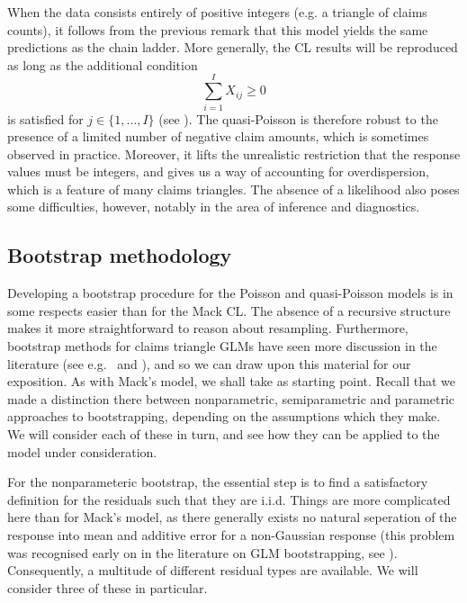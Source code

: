 \documentclass[a4paper]{book}
\begin{document}
When the data consists entirely of positive integers (e.g. a triangle of claims counts), it follows from the previous remark that this model yields the same predictions as the chain ladder. More generally, the CL results will be reproduced as long as the additional condition
\begin{equation}
  \sum_{i = 1}^I X_{ij} \geq 0
\end{equation}
is satisfied for $j \in \{ 1, \dots, I \}$ (see \cite[Section 2]{renshaw}). The quasi-Poisson is therefore robust to the presence of a limited number of negative claim amounts, which is sometimes observed in practice. Moreover, it lifts the unrealistic restriction that the response values must be integers, and gives us a way of accounting for overdispersion, which is a feature of many claims triangles. The absence of a likelihood also poses some difficulties, however, notably in the area of inference and diagnostics.

\subsection{Bootstrap methodology}

Developing a bootstrap procedure for the Poisson and quasi-Poisson models is in some respects easier than for the Mack CL. The absence of a recursive structure makes it more straightforward to reason about resampling. Furthermore, bootstrap methods for claims triangle GLMs have seen more discussion in the literature (see e.g.\ \cite{pinheiro} and \cite{england:dist}), and so we can draw upon this material for our exposition. As with Mack's model, we shall take  as starting point. Recall that we made a distinction there between nonparametric, semiparametric and parametric approaches to bootstrapping, depending on the assumptions which they make. We will consider each of these in turn, and see how they can be applied to the model under consideration.

For the nonparameteric bootstrap, the essential step is to find a satisfactory definition for the residuals such that they are i.i.d. Things are more complicated here than for Mack's model, as there generally exists no natural seperation of the response into mean and additive error for a non-Gaussian response (this problem was recognised early on in the literature on GLM bootstrapping, see \cite{moulton}). Consequently, a multitude of different residual types are available. We will consider three of these in particular.
\end{document}
